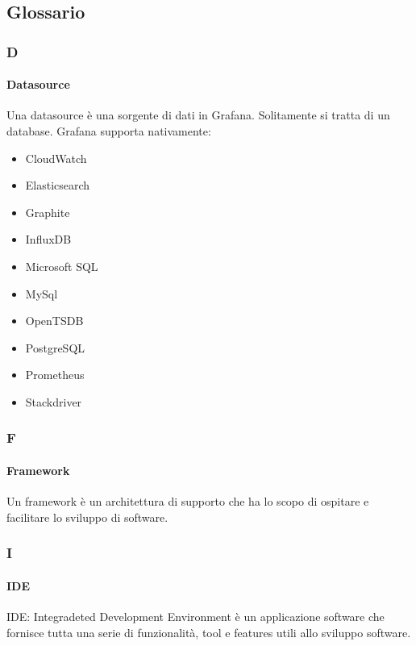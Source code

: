 \subsection{Glossario}
\subsubsection{D}

\paragraph{Datasource} \Spazio
\label{sec:datasource} 
Una datasource è una sorgente di dati in Grafana. Solitamente si tratta di un database. Grafana supporta nativamente:
	\begin{itemize}
	\item CloudWatch
	\item Elasticsearch
	\item Graphite
	\item InfluxDB
	\item Microsoft SQL
	\item MySql
	\item OpenTSDB
	\item PostgreSQL
	\item Prometheus
	\item Stackdriver
	\end{itemize}


\subsubsection{F}

	\paragraph{Framework} \Spazio
	\label{sec:ide}
Un framework è un architettura di supporto che ha lo scopo di ospitare e facilitare lo sviluppo di software.


\subsubsection{I}

	\paragraph{IDE} \Spazio
	\label{sec:ide}
IDE: Integradeted Development Environment è un applicazione software che fornisce tutta una serie di funzionalità, tool e features utili allo sviluppo software.

